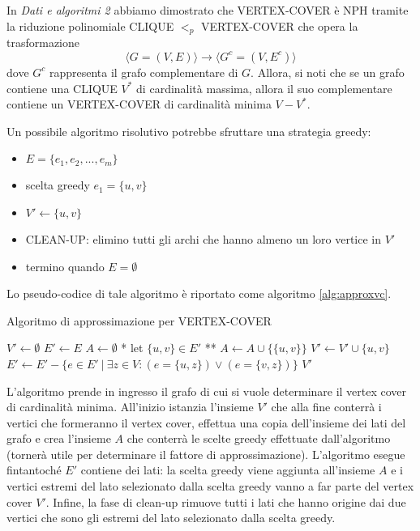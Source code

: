In \textit{Dati e algoritmi 2} abbiamo dimostrato che VERTEX-COVER è NPH tramite la riduzione polinomiale CLIQUE $<_p$ VERTEX-COVER che opera la trasformazione
\[
\langle G=(V,E)\rangle  \longrightarrow \langle G^c=(V,E^c)\rangle
\]
dove $G^c$ rappresenta il grafo complementare di $G$. Allora, si noti che se un grafo contiene una CLIQUE $V^*$ di cardinalità massima, allora il suo complementare contiene un VERTEX-COVER di cardinalità minima $V-V^*$.

Un possibile algoritmo risolutivo potrebbe sfruttare una strategia greedy:
\begin{itemize}
\item $E=\{e_1, e_2, ..., e_m\}$
\item scelta greedy $e_1=\{u,v\}$
\item $V' \longleftarrow \{u,v\}$
\item CLEAN-UP: elimino tutti gli archi che hanno almeno un loro vertice in $V'$
\item termino quando $E=\emptyset$
\end{itemize}

Lo pseudo-codice di tale algoritmo è riportato come algoritmo \ref{alg:approxvc}.
\begin{algorithm}
\caption{Algoritmo di approssimazione per VERTEX-COVER}
\label{alg:approxvc}
\begin{algorithmic}
	\State $V' \gets \emptyset$
	\State $E' \gets E$
	\State $A \gets \emptyset$
		\State ** let $\{u,v\}\in E'$ **
		\State $A \gets A \cup \{\{u,v\}\}$
		\State $V' \gets V' \cup \{u,v\}$
		\State $E' \gets E' - \{e \in E'\ |\ \exists z \in V : (e=\{u,z\}) \lor (e=\{v,z\})\}$
	\EndWhile
	\State \Return $V'$
\EndFunction
\end{algorithmic}
\end{algorithm}

L'algoritmo prende in ingresso il grafo di cui si vuole determinare il vertex cover di cardinalità minima. All'inizio istanzia l'insieme $V'$ che alla fine conterrà i vertici che formeranno il vertex cover, effettua una copia dell'insieme dei lati del grafo e crea l'insieme $A$ che conterrà le scelte greedy effettuate dall'algoritmo (tornerà utile per determinare il fattore di approssimazione). L'algoritmo esegue fintantoché $E'$ contiene dei lati: la scelta greedy viene aggiunta all'insieme $A$ e i vertici estremi del lato selezionato dalla scelta greedy vanno a far parte del vertex cover $V'$. Infine, la fase di clean-up rimuove tutti i lati che hanno origine dai due vertici che sono gli estremi del lato selezionato dalla scelta greedy.

